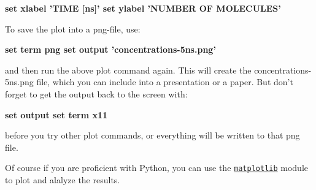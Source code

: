 {\begin{itemize}
\begin{enumerate}
\par
{\bf  set xlabel 'TIME \mbox{[}ns\mbox{]}' set ylabel 'NUMBER OF MOLECULES' }\par
\par
 To save the plot into a png-file, use: \par
\par
{\bf  set term png set output 'concentrations-5ns.png' }\par
\par
 and then run the above plot command again. This will create the concentrations-5ns.png file, which you can include into a presentation or a paper. But don't forget to get the output back to the screen with: \par
\par
{\bf  set output set term x11 }\par
\par
 before you try other plot commands, or everything will be written to that png file. \par
\par
 Of course if you are proficient with Python, you can use the \href{http://matplotlib.sourceforge.net}{\tt matplotlib} module to plot and alalyze the results. \end{enumerate}
\end{itemize}
}